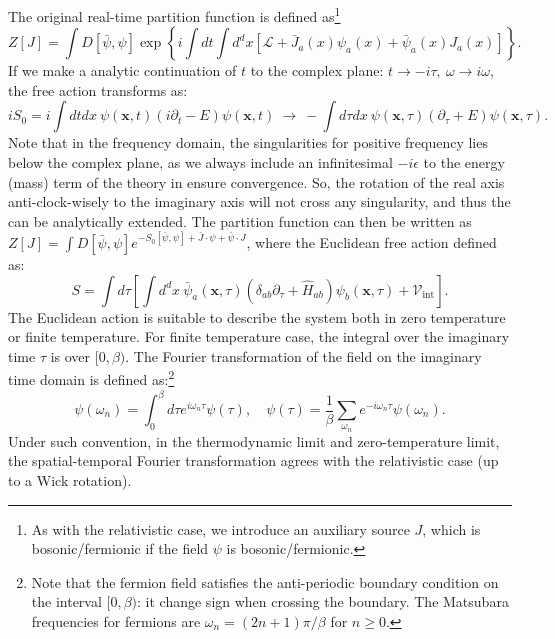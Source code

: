 \documentclass[aps,prb,superscriptaddress,nofootinbib]{revtex4}
\begin{document}
The original real-time partition function is defined as\footnote{As with the relativistic case, we introduce an auxiliary source $J$, which is bosonic/fermionic if the field $\psi$ is bosonic/fermionic.
}
\begin{equation}
	Z[J] = \int D[\bar\psi,\psi] \exp\left\{i\int dt \int d^dx \left[\mathcal{L}+\bar{J}_a(x)\psi_a(x)+\bar{\psi}_a(x)J_a(x)\right]\right\}.
\end{equation}
If we make a analytic continuation of $t$ to the complex plane: $t \rightarrow -i\tau, \ \omega \rightarrow i\omega$, the free action transforms as:
\begin{equation}
	iS_0 = i \int dt dx\ \psi(\bm x, t) (i\partial_t - E) \psi(\bm x, t) \ \longrightarrow \ 
	-\int d\tau dx\ \psi(\bm x, \tau) (\partial_\tau + E) \psi(\bm x, \tau).
\end{equation}
Note that in the frequency domain, the singularities for positive frequency lies below the complex plane, as we always include an infinitesimal $-i\epsilon$ to the energy (mass) term of the theory in ensure convergence. So, the rotation of the real axis anti-clock-wisely to the imaginary axis will not cross any singularity, and thus the can be analytically extended.
The partition function can then be written as $Z[J] = \int D[\bar\psi,\psi] e^{-S_0[\bar\psi,\psi]+\bar{J}\cdot\psi+\bar{\psi}\cdot J}$, where the Euclidean free action defined as:
\begin{equation}
	S = \int d\tau \left[\int d^dx\ \bar\psi_a(\bm x,\tau) (\delta_{ab}\partial_\tau+\hat H_{ab})\psi_b(\bm x,\tau) + \mathcal{V}_\mathrm{int}\right].
\end{equation}
The Euclidean action is suitable to describe the system both in zero temperature or finite temperature.
For finite temperature case, the integral over the imaginary time $\tau$ is over $[0,\beta)$.
The Fourier transformation of the field on the imaginary time domain is defined as:\footnote{Note that the fermion field satisfies the anti-periodic boundary condition on the interval $[0,\beta)$: it change sign when crossing the boundary. The Matsubara frequencies for fermions are $\omega_n = (2n+1)\pi/\beta$ for $n \ge 0$.}
\begin{equation}
	\psi(\omega_n) = \int_0^\beta d\tau e^{i\omega_n\tau} \psi(\tau),\quad
	\psi(\tau) = \frac{1}{\beta}\sum_{\omega_n} e^{-i\omega_n\tau} \psi(\omega_n).
\end{equation}
Under such convention, in the thermodynamic limit and zero-temperature limit, the spatial-temporal Fourier transformation agrees with the relativistic case (up to a Wick rotation).
\end{document}
